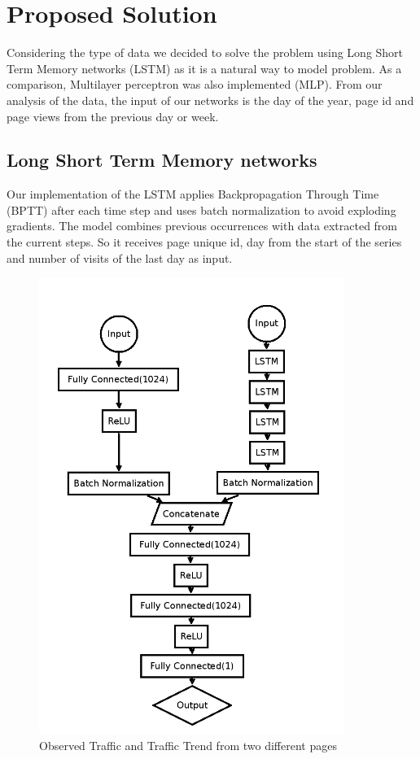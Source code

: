 \section{Proposed Solution}
\label{sec:solution}

Considering the type of data we decided to solve the problem using Long Short Term Memory networks (LSTM) as it is a natural way to model problem. As a comparison, Multilayer perceptron was also implemented (MLP). From our analysis of the data, the input of our networks is the day of the year, page id and page views from the previous day or week.

\subsection{Long Short Term Memory networks}

Our implementation of the LSTM applies Backpropagation Through Time (BPTT) after each time step and uses batch normalization to avoid exploding gradients.
The model combines previous occurrences with data extracted from the current steps. So it receives page unique id, day from the start of the series and number of visits of the last day as input.

\begin{figure}[h!]
    \centering
    \includegraphics[width=\linewidth]{lstm.png}
    \caption{Observed Traffic and Traffic Trend from two different pages}
    \label{fig:analysis1}
\end{figure}


